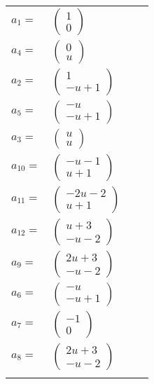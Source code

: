 \documentclass[1p]{elsarticle_modified}
\theoremstyle{definition}
\begin{document}
\begin{tabular}{m{7pt} m{180pt} m{7pt} m{180pt} }
\flushright $a_{1}=$&$\begin{pmatrix}1\\0\end{pmatrix}$ \\
\flushright $a_{4}=$&$\begin{pmatrix}0\\u\end{pmatrix}$ \\
\flushright $a_{2}=$&$\begin{pmatrix}1\\- u+1\end{pmatrix}$ \\
\flushright $a_{5}=$&$\begin{pmatrix}- u\\- u+1\end{pmatrix}$ \\
\flushright $a_{3}=$&$\begin{pmatrix}u\\u\end{pmatrix}$ \\
\flushright $a_{10}=$&$\begin{pmatrix}- u-1\\u+1\end{pmatrix}$ \\
\flushright $a_{11}=$&$\begin{pmatrix}-2 u-2\\u+1\end{pmatrix}$ \\
\flushright $a_{12}=$&$\begin{pmatrix}u+3\\- u-2\end{pmatrix}$ \\
\flushright $a_{9}=$&$\begin{pmatrix}2 u+3\\- u-2\end{pmatrix}$ \\
\flushright $a_{6}=$&$\begin{pmatrix}- u\\- u+1\end{pmatrix}$ \\
\flushright $a_{7}=$&$\begin{pmatrix}-1\\0\end{pmatrix}$ \\
\flushright $a_{8}=$&$\begin{pmatrix}2 u+3\\- u-2\end{pmatrix}$\\&\end{tabular}
\end{document}
